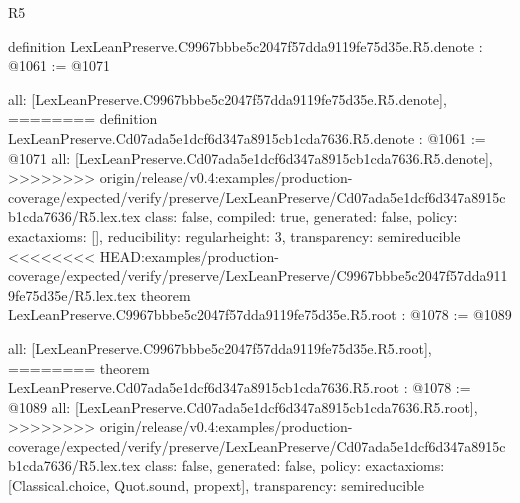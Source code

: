\begin{lexlean}{R5}
\begin{coremodule}
{{{{{{{definition LexLeanPreserve.C9967bbbe5c2047f57dda9119fe75d35e.R5.denote : @1061 := @1071 {
  all: [LexLeanPreserve.C9967bbbe5c2047f57dda9119fe75d35e.R5.denote],
========
definition LexLeanPreserve.Cd07ada5e1dcf6d347a8915cb1cda7636.R5.denote : @1061 := @1071 {
  all: [LexLeanPreserve.Cd07ada5e1dcf6d347a8915cb1cda7636.R5.denote],
>>>>>>>> origin/release/v0.4:examples/production-coverage/expected/verify/preserve/LexLeanPreserve/Cd07ada5e1dcf6d347a8915cb1cda7636/R5.lex.tex
  class: false,
  compiled: true,
  generated: false,
  policy: exact{axioms: []},
  reducibility: regular{height: 3},
  transparency: semireducible
}
<<<<<<<< HEAD:examples/production-coverage/expected/verify/preserve/LexLeanPreserve/C9967bbbe5c2047f57dda9119fe75d35e/R5.lex.tex
theorem LexLeanPreserve.C9967bbbe5c2047f57dda9119fe75d35e.R5.root : @1078 := @1089 {
  all: [LexLeanPreserve.C9967bbbe5c2047f57dda9119fe75d35e.R5.root],
========
theorem LexLeanPreserve.Cd07ada5e1dcf6d347a8915cb1cda7636.R5.root : @1078 := @1089 {
  all: [LexLeanPreserve.Cd07ada5e1dcf6d347a8915cb1cda7636.R5.root],
>>>>>>>> origin/release/v0.4:examples/production-coverage/expected/verify/preserve/LexLeanPreserve/Cd07ada5e1dcf6d347a8915cb1cda7636/R5.lex.tex
  class: false,
  generated: false,
  policy: exact{axioms: [Classical.choice, Quot.sound, propext]},
  transparency: semireducible
}

}}}}}}}}}
\end{coremodule}
\end{lexlean}
